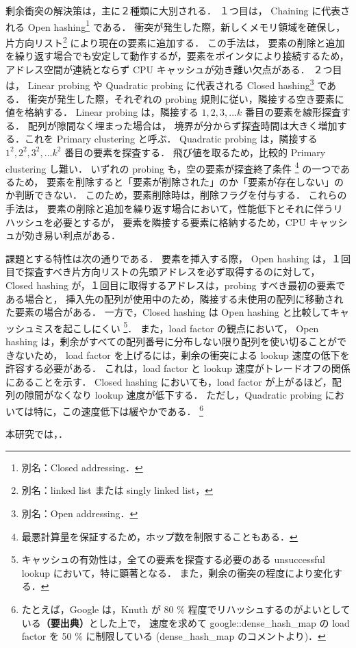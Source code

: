 剰余衝突の解決策は，主に２種類に大別される．
１つ目は，
Chaining に代表される Open hashing\footnote{別名：Closed addressing．} である．
衝突が発生した際，新しくメモリ領域を確保し，片方向リスト\footnote{別名：linked list または singly linked list，} により現在の要素に追加する．
この手法は，
要素の削除と追加を繰り返す場合でも安定して動作するが，要素をポインタにより接続するため，
アドレス空間が連続とならず CPU キャッシュが効き難い欠点がある．
２つ目は，
Linear probing や Quadratic probing に代表される Closed hashing\footnote{別名：Open addressing．} である．
衝突が発生した際，それぞれの probing 規則に従い，隣接する空き要素に値を格納する．
Linear probing は，隣接する $1, 2, 3, ... k$ 番目の要素を線形探査する．
配列が隙間なく埋まった場合は，
境界が分からず探査時間は大きく増加する．これを Primary clustering と呼ぶ．
Quadratic probing は，隣接する $1^2, 2^2, 3^2, ... k^2$ 番目の要素を探査する．
飛び値を取るため，比較的 Primary clustering し難い．
いずれの probing も，空の要素が探査終了条件 \footnote{最悪計算量を保証するため，ホップ数を制限することもある．} の一つであるため，
要素を削除すると「要素が削除された」のか「要素が存在しない」のか判断できない．
このため，要素削除時は，削除フラグを付与する．
これらの手法は，
要素の削除と追加を繰り返す場合において，性能低下とそれに伴うリハッシュを必要とするが，
要素を隣接する要素に格納するため，CPU キャッシュが効き易い利点がある．

課題とする特性は次の通りである．
要素を挿入する際，
Open hashing は，１回目で探査すべき片方向リストの先頭アドレスを必ず取得するのに対して，
Closed hashing が，１回目に取得するアドレスは，probing すべき最初の要素である場合と，
挿入先の配列が使用中のため，隣接する未使用の配列に移動された要素の場合がある．
一方で，Closed hashing は Open hashing と比較してキャッシュミスを起こしにくい
\footnote{キャッシュの有効性は，全ての要素を探査する必要のある unsuccessful lookup において，特に顕著となる．
また，剰余の衝突の程度により変化する．}．
また，load factor の観点において，
Open hashing は，剰余がすべての配列番号に分布しない限り配列を使い切ることができないため，
load factor を上げるには，剰余の衝突による lookup 速度の低下を許容する必要がある．
これは，load factor と  lookup 速度がトレードオフの関係にあることを示す．
Closed hashing においても，load factor が上がるほど，配列の隙間がなくなり lookup 速度が低下する．
ただし，Quadratic probing においては特に，この速度低下は緩やかである．
\footnote{たとえば，Google は，Knuth が 80 \% 程度でリハッシュするのがよいとしている{\bf \color{red}（要出典）}とした上で，
速度を求めて google::dense\_hash\_map の load factor を 50 \% に制限している (dense\_hash\_map のコメントより)．}

本研究では，．






